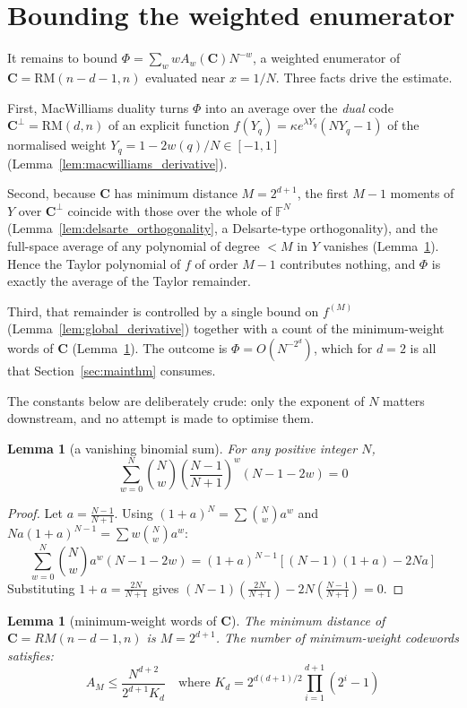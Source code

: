 \documentclass[11pt,a4paper]{article}
\newtheorem{lemma}[theorem]{Lemma}
\theoremstyle{definition}
\newcommand{\FF}{\mathbb{F}}
\newcommand{\RM}{\mathrm{RM}}
\begin{document}
\section{Bounding the weighted enumerator}\label{sec:rm-bound}

It remains to bound $\Phi=\sum_w wA_w(\mathbf C)N^{-w}$, a weighted enumerator of
$\mathbf C=\RM(n-d-1,n)$ evaluated near $x=1/N$. Three facts drive the estimate.

First, MacWilliams duality turns $\Phi$ into an average over the \emph{dual} code
$\mathbf C^\perp=\RM(d,n)$ of an explicit function
$f(Y_q)=\kappa e^{\lambda Y_q}(NY_q-1)$ of the normalised weight
$Y_q=1-2w(q)/N\in[-1,1]$ (Lemma~\ref{lem:macwilliams_derivative}).

Second, because $\mathbf C$ has minimum distance $M=2^{d+1}$, the first $M-1$
moments of $Y$ over $\mathbf C^\perp$ coincide with those over the whole of
$\FF^N$ (Lemma~\ref{lem:delsarte_orthogonality}, a Delsarte-type orthogonality),
and the full-space average of any polynomial of degree $<M$ in $Y$ vanishes
(Lemma~\ref{lem:binomial_identity}). Hence the Taylor polynomial of $f$ of order
$M-1$ contributes nothing, and $\Phi$ is exactly the average of the Taylor
remainder.

Third, that remainder is controlled by a single bound on $f^{(M)}$
(Lemma~\ref{lem:global_derivative}) together with a count of the minimum-weight
words of $\mathbf C$ (Lemma~\ref{lem:min_weight}). The outcome is
$\Phi=O(N^{-2^d})$, which for $d=2$ is all that Section~\ref{sec:mainthm} consumes.

The constants below are deliberately crude: only the exponent of $N$ matters
downstream, and no attempt is made to optimise them.

\begin{lemma}[a vanishing binomial sum]
\label{lem:binomial_identity}
For any positive integer $N$,
\[
\sum_{w=0}^N \binom{N}{w} \left(\frac{N-1}{N+1}\right)^w (N - 1 - 2w) = 0
\]
\end{lemma}

\begin{proof}
Let $a = \frac{N-1}{N+1}$. Using $(1+a)^N = \sum \binom{N}{w} a^w$ and $N a (1+a)^{N-1} = \sum w \binom{N}{w} a^w$:
\[
\sum_{w=0}^N \binom{N}{w} a^w (N - 1 - 2w) = (1+a)^{N-1} \left[ (N-1)(1+a) - 2Na \right]
\]
Substituting $1+a = \frac{2N}{N+1}$ gives $(N-1)\left(\frac{2N}{N+1}\right) - 2N\left(\frac{N-1}{N+1}\right) = 0$.
\end{proof}

\begin{lemma}[minimum-weight words of $\mathbf{C}$]
\label{lem:min_weight}
The minimum distance of $\mathbf{C} = RM(n-d-1, n)$ is $M = 2^{d+1}$. The number of minimum-weight codewords satisfies:
\[
A_M \le \frac{N^{d+2}}{2^{d+1} K_d} \quad \text{where } K_d = 2^{d(d+1)/2} \prod_{i=1}^{d+1} (2^i - 1)
\]
\end{lemma}
\end{document}
